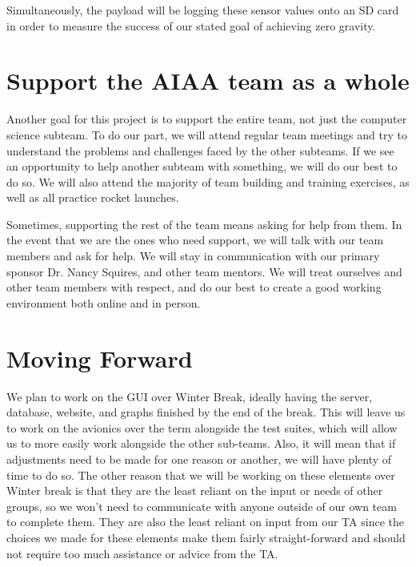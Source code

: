 \documentclass[onecolumn, draftclsnofoot, 10pt, compsoc]{IEEEtran}
\begin{document}
Simultaneously, the payload will be logging these sensor values onto an SD card in order to measure the success of our stated goal of achieving zero gravity.


\section{Support the AIAA team as a whole}
Another goal for this project is to support the entire team, not just the computer science subteam.  To do our part, we will attend regular team meetings and try to understand the problems and challenges faced by the other subteams.  If we see an opportunity to help another subteam with something, we will do our best to do so.  We will also attend the majority of team building and training exercises, as well as all practice rocket launches.

Sometimes, supporting the rest of the team means asking for help from them.  In the event that we are the ones who need support, we will talk with our team members and ask for help.  We will stay in communication with our primary sponsor Dr. Nancy Squires, and other team mentors.  We will treat ourselves and other team members with respect, and do our best to create a good working environment both online and in person.


\section{Moving Forward}
We plan to work on the GUI over Winter Break, ideally having the server, database, website, and graphs finished by the end of the break. This will leave us to work on the avionics over the term alongside the test suites, which will allow us to more easily work alongside the other sub-teams. Also, it will mean that if adjustments need to be made for one reason or another, we will have plenty of time to do so. The other reason that we will be working on these elements over Winter break is that they are the least reliant on the input or needs of other groups, so we won't need to communicate with anyone outside of our own team to complete them. They are also the least reliant on input from our TA since the choices we made for these elements make them fairly straight-forward and should not require too much assistance or advice from the TA.
\end{document}
